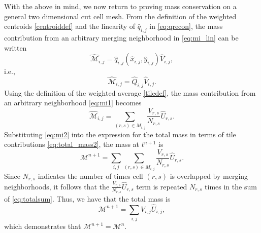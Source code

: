 With the above in mind, we now return to proving mass conservation on a general two dimensional cut cell mesh.
From the definition of the weighted centroids \eqref{centroiddef} and the linearity of $\widehat{q}_{i,j}$ in \eqref{eq:qrecon}, the mass contribution from an arbitrary merging neighborhood in \eqref{eq:mi_lin} can be written
\begin{equation*}
\widehat{\mathcal{M}}_{i,j} = \widehat q_{i,j}(\widehat{x}_{i,j}, \widehat{y}_{i,j}) \widehat V_{i,j},
\end{equation*}
i.e.,
\begin{equation}\label{eq:mi1}
\widehat{\mathcal{M}}_{i,j} = \widehat Q_{i,j} \widehat V_{i,j}.
\end{equation}
Using the definition of the weighted average \eqref{tiledef}, the mass contribution from an arbitrary neighborhood \eqref{eq:mi1} becomes
\begin{equation}\label{eq:mi2}
\widehat{\mathcal{M}}_{i,j} = \sum_{(r,s) \in M_{i,j} }\frac{V_{r,s}}{N_{r,s}} \widehat U_{r,s}.
\end{equation}
Substituting \eqref{eq:mi2} into the expression for the total mass in terms of tile contributions \eqref{eq:total_mass2}, the mass at $t^{n+1}$ is
\begin{equation}\label{eq:totalsum}
\mathcal{M}^{n+1} = \sum_{i,j} \sum_{(r,s) \in M_{i,j} }\frac{V_{r,s}}{N_{r,s}} \widehat U_{r,s}.
\end{equation}
Since $N_{r,s}$ indicates the number of times cell $(r,s)$ is overlapped by merging neighborhoods, it follows that the $\frac{V_{r,s}}{N_{r,s}} \widehat U_{r,s}$ term is repeated $N_{r,s}$ times in the sum of \eqref{eq:totalsum}.  Thus, we have that the total mass is
\begin{equation} \label{eq:final}
\mathcal{M}^{n+1} = \sum_{i,j} V_{i,j} \widehat U_{i,j},
\end{equation}
which demonstrates that $\mathcal{M}^{n+1}  = \mathcal{M}^{n}$.

